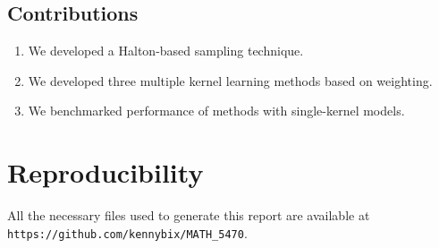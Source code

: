 \documentclass[11pt, letterpaper]{article}
\begin{document}
\subsection{Contributions}
    \begin{enumerate}
        \item We developed a Halton-based sampling technique.
        \item We developed three multiple kernel learning methods based on weighting.
        \item We benchmarked performance of methods with single-kernel models.
    \end{enumerate}

\section{Reproducibility}
All the necessary files used to generate this report are available at \nolinkurl{https://github.com/kennybix/MATH_5470}.

\begin{small}
{}

\end{small}
\clearpage
 
\end{document}
